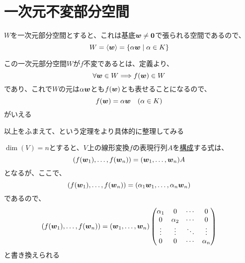 \documentclass[../../../topic_linear-algebra]{subfiles}
\begin{document}
\sectionline
\section{一次元不変部分空間}\label{sec:1d-invariant-subspaces}

$W$を一次元部分空間とすると、これは基底$\vb*{w} \neq \vb*{0}$で張られる空間であるので、
\begin{equation*}
  W = \langle \vb*{w} \rangle = \{ \alpha \vb*{w} \mid \alpha \in K \}
\end{equation*}

この一次元部分空間$W$が$f$不変であるとは、定義より、
\begin{equation*}
  \forall \vb*{w} \in W \Longrightarrow f(\vb*{w}) \in W
\end{equation*}
であり、これで$W$の元は$\alpha \vb*{w}$とも$f(\vb*{w})$とも表せることになるので、
\begin{equation*}
  f(\vb*{w}) = \alpha \vb*{w} \quad (\alpha \in K)
\end{equation*}
がいえる

\br

以上をふまえて、という定理をより具体的に整理してみる

\br

$\dim(V) = n$とすると、$V$上の線形変換$f$の表現行列$A$を\hyperref[sec:construction-of-matrix-rep]{構成}する式は、
\begin{equation*}
  (f(\vb*{w}_1), \ldots, f(\vb*{w}_n)) = (\vb*{w}_1, \ldots, \vb*{w}_n) A
\end{equation*}
となるが、ここで、
\begin{equation*}
  (f(\vb*{w}_1), \ldots, f(\vb*{w}_n)) = (\alpha_1 \vb*{w}_1, \ldots, \alpha_n \vb*{w}_n)
\end{equation*}
であるので、
\begin{equation*}
  (f(\vb*{w}_1), \ldots, f(\vb*{w}_n)) = (\vb*{w}_1, \ldots, \vb*{w}_n) \begin{pmatrix}
    \alpha_1 & 0        & \cdots & 0        \\
    0        & \alpha_2 & \cdots & 0        \\
    \vdots   & \vdots   & \ddots & \vdots   \\
    0        & 0        & \cdots & \alpha_n
  \end{pmatrix}
\end{equation*}
と書き換えられる

\br
\end{document}
